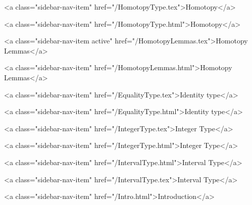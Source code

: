       
    
      
        
          <a class="sidebar-nav-item" href="/HomotopyType.tex">Homotopy</a>
        
      
    
      
        
          <a class="sidebar-nav-item" href="/HomotopyType.html">Homotopy</a>
        
      
    
      
        
          <a class="sidebar-nav-item active" href="/HomotopyLemmas.tex">Homotopy Lemmas</a>
        
      
    
      
        
          <a class="sidebar-nav-item" href="/HomotopyLemmas.html">Homotopy Lemmas</a>
        
      
    
      
        
          <a class="sidebar-nav-item" href="/EqualityType.tex">Identity type</a>
        
      
    
      
        
          <a class="sidebar-nav-item" href="/EqualityType.html">Identity type</a>
        
      
    
      
        
          <a class="sidebar-nav-item" href="/IntegerType.tex">Integer Type</a>
        
      
    
      
        
          <a class="sidebar-nav-item" href="/IntegerType.html">Integer Type</a>
        
      
    
      
        
          <a class="sidebar-nav-item" href="/IntervalType.html">Interval Type</a>
        
      
    
      
        
          <a class="sidebar-nav-item" href="/IntervalType.tex">Interval Type</a>
        
      
    
      
        
          <a class="sidebar-nav-item" href="/Intro.html">Introduction</a>
        
